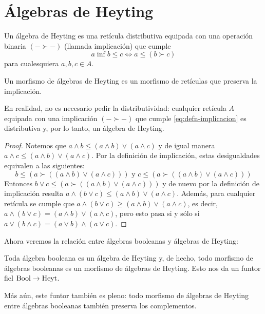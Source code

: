 \section{Álgebras de Heyting}
\label{ss:heyting}

\begin{definition}\label{defn:heyting}
  Un álgebra de Heyting es una retícula distributiva equipada con una
  operación binaria $(-\succ-)$ (llamada implicación) que cumple
  \begin{equation}\label{eq:defn-implicacion}
    a \inf b \leq c \iff a \leq (b\succ c)
  \end{equation}
  para cualesquiera $a,b,c\in A$.

  Un morfismo de álgebras de Heyting es un morfismo de retículas
  que preserva la implicación.
\end{definition}

En realidad, no es necesario pedir la distributividad: cualquier
retícula $A$ equipada con una implicación $(-\succ-)$ que cumple
\eqref{eq:defn-implicacion} es distributiva y, por lo tanto, un
álgebra de Heyting.

\begin{proof}
    Notemos que $a\wedge b \leq (a\wedge b)\vee (a\wedge c)$ y de
    igual manera $a\wedge c\leq  (a\wedge b)\vee (a\wedge c)$. Por la
    definición de implicación, estas desigualdades equivalen a las
    siguientes:
    $$b\leq (a \succ ((a \wedge b) \vee (a \wedge c))) \mbox{ y } c
    \leq (a\succ ((a \wedge b) \vee (a \wedge c)))$$
    Entonces $b \vee c \leq (a \succ ((a \wedge b) \vee (a \wedge
    c)))$ y de nuevo por la definición de implicación resulta $a
    \wedge (b \vee c)\leq (a\wedge b)\vee (a \wedge c)$. Además, para
    cualquier retícula se cumple que $a \wedge (b \vee c)\geq (a\wedge
    b)\vee (a \wedge c)$, es decir, $a \wedge (b \vee c)= (a\wedge
    b)\vee (a \wedge c)$, pero esto pasa si y sólo si $a \vee (b
    \wedge c)= (a\vee b)\wedge (a \vee c)$.
\end{proof}

Ahora veremos la relación entre álgebras booleanas y álgebras de
Heyting:
\begin{lemma}
  Toda álgebra booleana es un álgebra de Heyting y, de hecho,
  todo morfismo de álgebras booleanas es un morfismo de álgebras de
  Heyting. Esto nos da un funtor fiel $\mathrm{Bool}\to\mathrm{Heyt}$.

  Más aún, este funtor también es pleno: todo morfismo de álgebras de
  Heyting entre álgebras booleanas también preserva los complementos.
\end{lemma}

